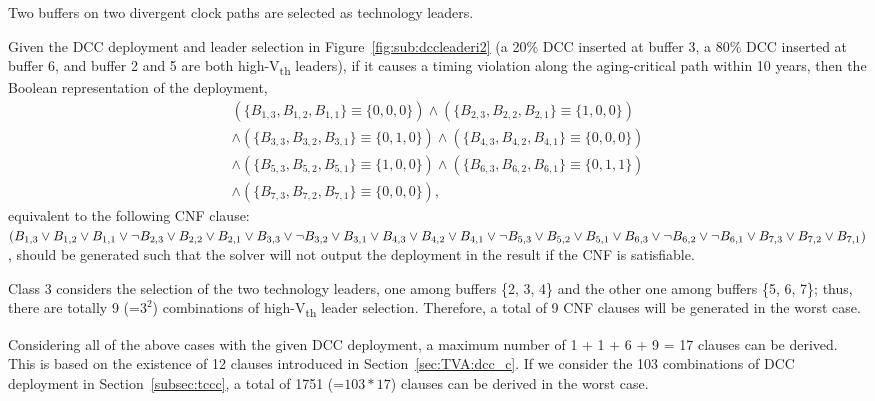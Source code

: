 \begin{class}
\label{class:c6}
Two buffers on two divergent clock paths are selected as technology leaders.

Given the DCC deployment and leader selection in Figure~\ref{fig:sub:dccleaderi2} (a 20\% DCC inserted at buffer 3, a 80\% DCC inserted at buffer 6, and buffer 2 and 5 are both  high-V\textsubscript{th} leaders), if it causes a timing violation along the aging-critical path within 10 years, then the Boolean representation of the deployment, 
{\fontsize{8}{8.4}
\begin{gather*}
\left(\{B_{1,3}, B_{1,2}, B_{1,1}\} \equiv \{0, 0, 0\} \right) \land \left( \{B_{2,3}, B_{2,2}, B_{2,1}\} \equiv \{1, 0, 0\} \right) \\ 
\land \left( \{B_{3,3}, B_{3,2}, B_{3,1}\} \equiv \{0, 1, 0\} \right) \land \left( \{B_{4,3}, B_{4,2}, B_{4,1}\} \equiv \{0, 0, 0\} \right) \\ 
\land \left( \{B_{5,3}, B_{5,2}, B_{5,1}\} \equiv \{1, 0, 0\} \right) \land \left( \{B_{6,3}, B_{6,2}, B_{6,1}\} \equiv \{0, 1, 1\} \right) \\ 
\land \left( \{B_{7,3}, B_{7,2}, B_{7,1}\} \equiv \{0, 0, 0\} \right),
\end{gather*}
}
equivalent to the following  CNF clause: 
{\fontsize{8}{8.4}$(B_{1,3} \lor B_{1,2} \lor B_{1,1} \lor \neg B_{2,3} \lor B_{2,2} \lor B_{2,1} \lor B_{3,3} \lor \neg B_{3,2} \lor B_{3,1} \lor B_{4,3} \lor B_{4,2} \lor B_{4,1} \lor \neg B_{5,3} \\
\lor B_{5,2} \lor B_{5,1} \lor B_{6,3} \lor \neg B_{6,2} \lor  \neg B_{6,1} \lor B_{7,3} \lor B_{7,2} \lor B_{7,1} )$}, should be generated such that the solver will not output the deployment in the result if the CNF is satisfiable.

Class 3 considers the selection of the two technology leaders, one among buffers \{2, 3, 4\} and the other one among buffers \{5, 6, 7\}; thus, there are totally 9 (=$3^2$) combinations of high-V\textsubscript{th} leader selection. Therefore, a total of 9 CNF clauses will be generated in the worst case.

Considering all of the above cases with the given DCC deployment, a maximum number of 1 + 1 + 6 + 9 = 17 clauses can be derived. This is based on the existence of 12 clauses introduced in Section~\ref{sec:TVA:dcc_c}. If we consider the 103 combinations of DCC deployment in Section~\ref{subsec:tccc}, a total of 1751 (=$103*17$) clauses can be derived in the worst case.

\end{class}

